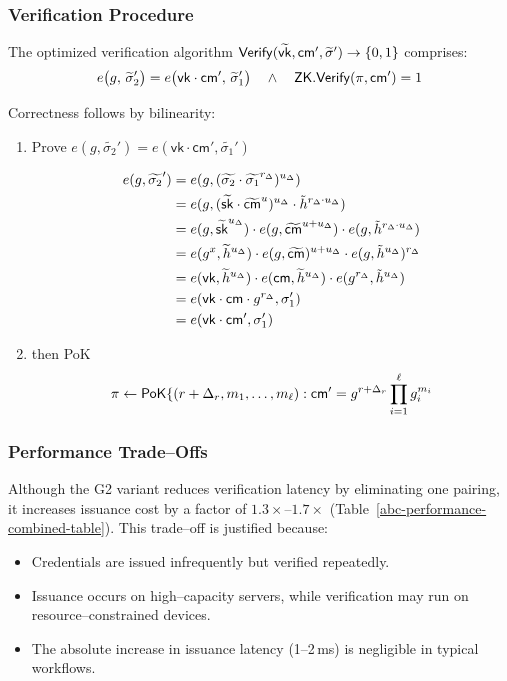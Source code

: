 \subsubsection*{Verification Procedure}

The optimized verification algorithm $\mathsf{Verify}(\widetilde{\mathsf{vk}},\mathsf{cm}',\widetilde\sigma')\to\{0,1\}$ comprises:
    $$
    e\bigl(g,\,\widetilde\sigma_2'\bigr) = e\bigl(\mathsf{vk}\cdot\mathsf{cm}',\,\widetilde\sigma_1'\bigr) \quad \wedge \quad \mathsf{ZK.Verify}(\pi,\mathsf{cm}')=1
    $$

Correctness follows by bilinearity:
\begin{enumerate}
    \item Prove $e(g, \widetilde{\sigma_2}') = e(\mathsf{vk} \cdot \mathsf{cm}', \widetilde{\sigma_1}')$
    
    \begin{align*}
        e(g, \widetilde{\sigma_2}') &= e(g, (\widetilde{\sigma_2} \cdot \widetilde{\sigma_1}^{r_\Delta})^{u_\Delta}) \\
        &= e(g, (\widetilde{\mathsf{sk}} \cdot \widetilde{\mathsf{cm}}^{u})^{u_\Delta} \cdot \tilde{h}^{r_{\Delta} \cdot u_\Delta}) \\
        &= e(g, \widetilde{\mathsf{sk}}^{u_\Delta}) \cdot e(g, \widetilde{\mathsf{cm}}^{u + u_\Delta}) \cdot e(g,\tilde{h}^{r_{\Delta} \cdot u_\Delta}) \\
        &= e(g^x, \widetilde{h}^{u_\Delta}) \cdot e(g, \widetilde{\mathsf{cm}})^{u + u_\Delta} \cdot e(g,\tilde{h}^{u_\Delta})^{r_{\Delta}} \\
        &= e(\mathsf{vk}, \widetilde{h}^{u_\Delta}) \cdot e(\mathsf{cm}, \widetilde{h}^{u_\Delta}) \cdot e(g^{r_{\Delta}},\tilde{h}^{u_\Delta}) \\
        &= e(\mathsf{vk} \cdot \mathsf{cm} \cdot g^{r_{\Delta}}, \sigma_1')  \\
        &= e(\mathsf{vk} \cdot \mathsf{cm}', \sigma_1')  \\
    \end{align*}

    \item then PoK
    \[
        \pi \gets \mathsf{PoK}\{(r + \Delta_r, m_1,\ldots,m_\ell): \mathsf{cm}' = g^{r + \Delta_r} \prod_{i=1}^\ell g_i^{m_i}
    \]
\end{enumerate}
 

\subsubsection*{Performance Trade–Offs}

Although the G2 variant reduces verification latency by eliminating one pairing, it increases issuance cost by a factor of $1.3\times$–$1.7\times$ (Table~\ref{abc-performance-combined-table}). This trade–off is justified because:
\begin{itemize}
  \item Credentials are issued infrequently but verified repeatedly.
  \item Issuance occurs on high–capacity servers, while verification may run on resource–constrained devices.
  \item The absolute increase in issuance latency (1–2\,ms) is negligible in typical workflows.
\end{itemize}




